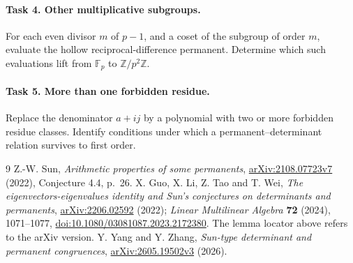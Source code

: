 \documentclass[11pt]{article}
\newcommand{\Fp}{\mathbb F_p}
\begin{document}
\paragraph{Task 4. Other multiplicative subgroups.}
For each even divisor $m$ of $p-1$, and a coset of the subgroup of
order $m$, evaluate the hollow reciprocal-difference permanent.
Determine which such evaluations lift from $\Fp$ to $\mathbb Z/p^2\mathbb Z$.

\paragraph{Task 5. More than one forbidden residue.}
Replace the denominator $a+ij$ by a polynomial with two or more
forbidden residue classes. Identify conditions under which a
permanent--determinant relation survives to first order.

\begin{thebibliography}{9}
 Z.-W. Sun, \emph{Arithmetic properties of some permanents},
\href{https://arxiv.org/abs/2108.07723v7}{arXiv:2108.07723v7} (2022),
Conjecture 4.4, p.~26.
 X. Guo, X. Li, Z. Tao and T. Wei,
\emph{The eigenvectors-eigenvalues identity and Sun's conjectures on
determinants and permanents},
\href{https://arxiv.org/abs/2206.02592}{arXiv:2206.02592} (2022);
\emph{Linear Multilinear Algebra} \textbf{72} (2024), 1071--1077,
\href{https://doi.org/10.1080/03081087.2023.2172380}{doi:10.1080/03081087.2023.2172380}.
The lemma locator above refers to the arXiv version.
 Y. Yang and Y. Zhang,
\emph{Sun-type determinant and permanent congruences},
\href{https://arxiv.org/abs/2605.19502v3}{arXiv:2605.19502v3} (2026).
\end{thebibliography}
\end{document}
